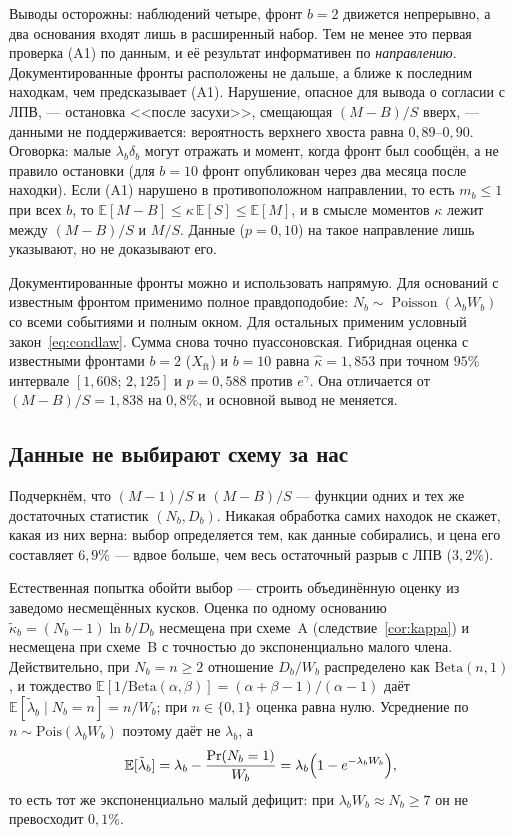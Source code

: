 \documentclass[11pt,a4paper]{article}
\theoremstyle{plain}
\theoremstyle{remark}
\newcommand{\eg}{e^{\gamma}}
\DeclareMathOperator{\Pois}{Poisson}
\begin{document}
Выводы осторожны: наблюдений четыре, фронт $b=2$ движется непрерывно, а два
основания входят лишь в расширенный набор. Тем не менее это первая проверка (A1)
по данным, и её результат информативен по \emph{направлению}. Документированные
фронты расположены не дальше, а ближе к последним находкам, чем предсказывает (A1).
Нарушение, опасное для вывода о согласии с ЛПВ, --- остановка <<после засухи>>, смещающая
$(M-B)/S$ вверх, --- данными не поддерживается: вероятность верхнего хвоста равна
$0{,}89$--$0{,}90$. Оговорка: малые $\lambda_b\delta_b$ могут отражать и момент, когда
фронт был сообщён, а не правило остановки (для $b=10$ фронт опубликован через два
месяца после находки). Если (A1) нарушено в противоположном направлении, то есть
$m_b\le1$ при всех $b$, то
$\mathbb E[M-B]\le\kappa\,\mathbb E[S]\le\mathbb E[M]$, и в смысле моментов
$\kappa$ лежит между $(M-B)/S$ и $M/S$. Данные ($p=0{,}10$) на такое направление
лишь указывают, но не доказывают его.

Документированные фронты можно и использовать напрямую. Для оснований с известным
фронтом применимо полное правдоподобие: $N_b\sim\Pois(\lambda_bW_b)$ со всеми
событиями и полным окном. Для остальных применим условный закон~\eqref{eq:condlaw}.
Сумма снова точно пуассоновская. Гибридная оценка с известными фронтами $b=2$
($X_{\mathrm{ft}}$) и $b=10$ равна $\hat\kappa=1{,}853$ при точном $95\%$
интервале $[1{,}608;\,2{,}125]$ и $p=0{,}588$ против $\eg$. Она отличается от
$(M-B)/S=1{,}838$ на $0{,}8\%$, и основной вывод не меняется.

\subsection{Данные не выбирают схему за нас}\label{sec:noescape}

Подчеркнём, что $(M-1)/S$ и $(M-B)/S$ --- функции одних и тех же достаточных статистик
$(N_b,D_b)$. Никакая обработка самих находок не скажет, какая из них верна: выбор
определяется тем, как данные собирались, и цена его составляет $6{,}9\%$ --- вдвое
больше, чем весь остаточный разрыв с ЛПВ ($3{,}2\%$).

Естественная попытка обойти выбор --- строить объединённую оценку из заведомо
несмещённых кусков.
Оценка по одному основанию $\tilde\kappa_b=(N_b-1)\ln b/D_b$ несмещена при схеме~A
(следствие~\ref{cor:kappa}) и несмещена при схеме~B с точностью до экспоненциально
малого члена. Действительно, при $N_b=n\ge2$ отношение $D_b/W_b$ распределено как
$\mathrm{Beta}(n,1)$, и тождество
$\mathbb E[1/\mathrm{Beta}(\alpha,\beta)]=(\alpha+\beta-1)/(\alpha-1)$ даёт
$\mathbb E[\tilde\lambda_b\mid N_b=n]=n/W_b$; при $n\in\{0,1\}$ оценка равна нулю.
Усреднение по $n\sim\mathrm{Pois}(\lambda_bW_b)$ поэтому даёт не $\lambda_b$, а
\[
  \mathbb E[\tilde\lambda_b]=\lambda_b-\frac{\Pr(N_b=1)}{W_b}
  =\lambda_b\Bigl(1-e^{-\lambda_bW_b}\Bigr),
\]
то есть тот же экспоненциально малый дефицит: при $\lambda_bW_b\approx N_b\ge7$ он
не превосходит $0{,}1\%$.
\end{document}
